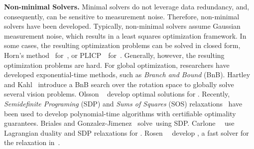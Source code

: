 {\bf Non-minimal Solvers.} Minimal solvers do not leverage data redundancy, and, consequently, can be sensitive to measurement noise. Therefore, non-minimal solvers have been developed. Typically, %
non-minimal solvers 
assume Gaussian measurement noise, which results in a {least squares} optimization framework. 
In some cases, the resulting optimization problems can be solved in closed form,  %
\eg Horn's method~\cite{Horn87josa} for~\PCR, or
 PLICP~\cite{Censi08icra}~for~\GReg.
Generally, however, the resulting optimization problems are hard. For global optimization, researchers have developed exponential-time methods, such as \emph{Branch and Bound} (BnB). 
Hartley and Kahl~\cite{Hartley09ijcv-globalRotationRegistration} introduce a BnB search over the rotation space to globally solve several vision problems. Olsson \etal~\cite{Olsson09pami-bnbRegistration} develop optimal solutions for \GReg.
Recently, \emph{Semidefinite Programing} (SDP) and \emph{Sums of Squares} (SOS) relaxations~\cite{Blekherman12Book-sdpandConvexAlgebraicGeometry}
have been used to develop
polynomial-time %
algorithms with certifiable optimality guarantees. 
Briales and Gonzalez-Jimenez~\cite{Briales17cvpr-registration}
solve~\GReg using SDP.
Carlone~\etal~\cite{Carlone16tro-duality2D,Carlone15iros-duality3D} use Lagrangian duality and SDP relaxations for \PGO.
 Rosen~\etal~\cite{Rosen18ijrr-sesync} develop \sesync, a fast solver for the relaxation in~\cite{Carlone16tro-duality2D,Carlone15iros-duality3D}.
